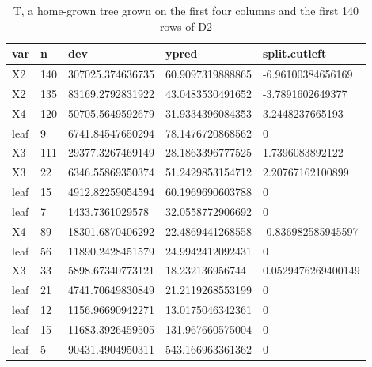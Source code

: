 \documentclass[12pt,twoside]{reedthesis}
\begin{document}
  \begin{table}
  
  \caption{\label{tab:unnamed-chunk-21}\label{tab:tabhomegrowntree}T, a home-grown tree grown on the first four columns and the first 140 rows of D2}
  \centering
  \begin{tabular}[t]{l|l|l|l|l}
  \hline
  var & n & dev & ypred & split.cutleft\\
  \hline
  X2 & 140 & 307025.374636735 & 60.9097319888865 & -6.96100384656169\\
  \hline
  X2 & 135 & 83169.2792831922 & 43.0483530491652 & -3.7891602649377\\
  \hline
  X4 & 120 & 50705.5649592679 & 31.9334396084353 & 3.2448237665193\\
  \hline
  leaf & 9 & 6741.84547650294 & 78.1476720868562 & 0\\
  \hline
  X3 & 111 & 29377.3267469149 & 28.1863396777525 & 1.7396083892122\\
  \hline
  X3 & 22 & 6346.55869350374 & 51.2429853154712 & 2.20767162100899\\
  \hline
  leaf & 15 & 4912.82259054594 & 60.1969690603788 & 0\\
  \hline
  leaf & 7 & 1433.7361029578 & 32.0558772906692 & 0\\
  \hline
  X4 & 89 & 18301.6870406292 & 22.4869441268558 & -0.836982585945597\\
  \hline
  leaf & 56 & 11890.2428451579 & 24.9942412092431 & 0\\
  \hline
  X3 & 33 & 5898.67340773121 & 18.232136956744 & 0.0529476269400149\\
  \hline
  leaf & 21 & 4741.70649830849 & 21.2119268553199 & 0\\
  \hline
  leaf & 12 & 1156.96690942271 & 13.0175046342361 & 0\\
  \hline
  leaf & 15 & 11683.3926459505 & 131.967660575004 & 0\\
  \hline
  leaf & 5 & 90431.4904950311 & 543.166963361362 & 0\\
  \hline
  \end{tabular}
  \end{table}
  
\end{document}
